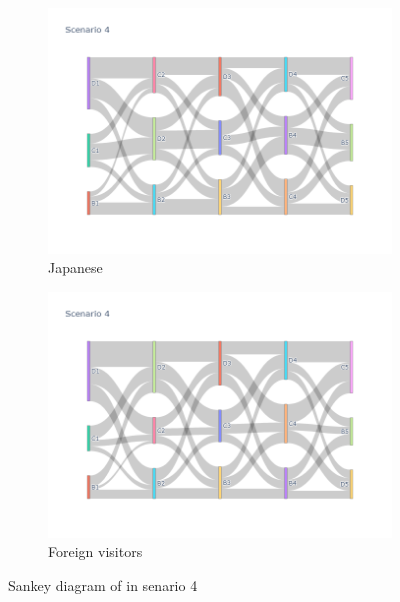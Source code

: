 \begin{figure}[h]
  \begin{subfigure}{0.5\textwidth}
    \centering
    \includegraphics[width=\textwidth]{Figure/Figure26d.jpg}
    \caption{Japanese}
  \end{subfigure}
  \begin{subfigure}{0.5\textwidth}
    \centering
    \includegraphics[width=\linewidth]{Figure/Figure27d.jpg}
    \caption{Foreign visitors}
  \end{subfigure}
  \caption{Sankey diagram of in senario 4 }
  \label{fig26d}
\end{figure}



